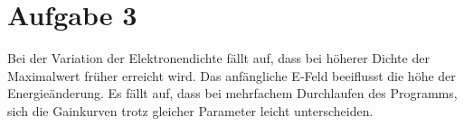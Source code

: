 \documentclass[11pt,a4paper]{article}
\begin{document}
	\section*{Aufgabe 3}
	Bei der Variation der Elektronendichte fällt auf, 
	dass bei höherer Dichte der Maximalwert früher erreicht wird.
	Das anfängliche E-Feld beeiflusst die höhe der Energieänderung.
	Es fällt auf, dass bei mehrfachem Durchlaufen des Programms, sich die Gainkurven trotz gleicher Parameter leicht unterscheiden.
\end{document}
